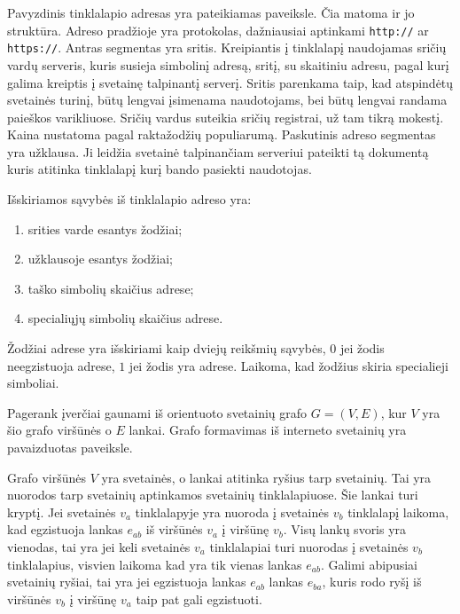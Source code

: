 Pavyzdinis tinklalapio adresas yra pateikiamas  paveiksle. Čia matoma ir jo struktūra. Adreso pradžioje yra protokolas, dažniausiai aptinkami \texttt{http://} ar \texttt{https://}. Antras segmentas yra sritis. Kreipiantis į tinklalapį naudojamas sričių vardų serveris, kuris susieja simbolinį adresą, sritį, su skaitiniu adresu, pagal kurį galima kreiptis į svetainę talpinantį serverį. Sritis parenkama taip, kad atspindėtų svetainės turinį, būtų lengvai įsimenama naudotojams, bei būtų lengvai randama paieškos varikliuose. Sričių vardus suteikia sričių registrai, už tam tikrą mokestį. Kaina nustatoma pagal raktažodžių populiarumą. Paskutinis adreso segmentas yra užklausa. Ji leidžia svetainė talpinančiam serveriui pateikti tą dokumentą kuris atitinka tinklalapį kurį bando pasiekti naudotojas.

Išskiriamos sąvybės iš tinklalapio adreso yra:
\begin{enumerate}
\item srities varde esantys žodžiai;
\item užklausoje esantys žodžiai;
\item taško simbolių skaičius adrese;
\item specialiųjų simbolių skaičius adrese.
\end{enumerate}
Žodžiai adrese yra išskiriami kaip dviejų reikšmių sąvybės, $0$ jei žodis neegzistuoja adrese, $1$ jei žodis yra adrese. Laikoma, kad žodžius skiria specialieji simboliai.

Pagerank įverčiai gaunami iš orientuoto svetainių grafo $G = (V, E)$, kur $V$ yra šio grafo viršūnės o $E$ lankai. Grafo formavimas iš interneto svetainių yra pavaizduotas  paveiksle.

Grafo viršūnės $V$ yra svetainės, o lankai atitinka ryšius tarp svetainių. Tai yra nuorodos tarp svetainių aptinkamos svetainių tinklalapiuose. Šie lankai turi kryptį. Jei svetainės $v_a$ tinklalapyje yra nuoroda į svetainės $v_b$ tinklalapį laikoma, kad egzistuoja lankas $e_{ab}$ iš viršūnės $v_a$ į viršūnę $v_b$. Visų lankų svoris yra vienodas, tai yra jei keli svetainės $v_a$ tinklalapiai turi nuorodas į svetainės $v_b$ tinklalapius, visvien laikoma kad yra tik vienas lankas $e_{ab}$. Galimi abipusiai svetainių ryšiai, tai yra jei egzistuoja lankas $e_{ab}$ lankas $e_{ba}$, kuris rodo ryšį iš viršūnės $v_b$ į viršūnę $v_a$ taip pat gali egzistuoti.

